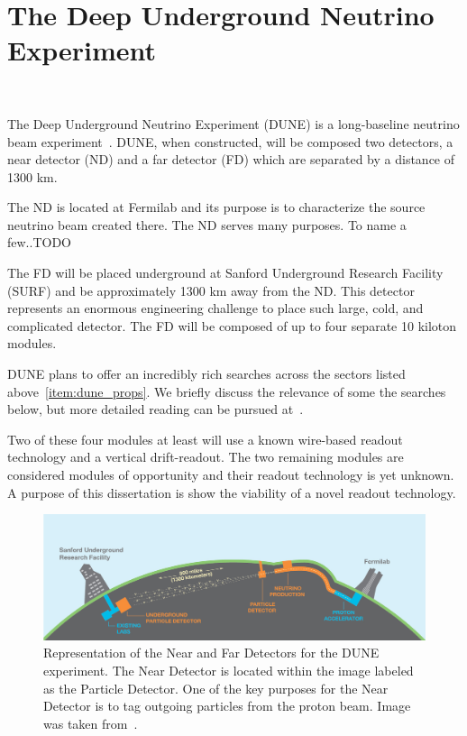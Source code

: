 
\section{The Deep Underground Neutrino Experiment}~\label{sec:dune}

The Deep Underground Neutrino Experiment (DUNE) is a long-baseline neutrino beam experiment~\citep{DUNE_TDR_V1_Abi_2020, DUNE_FD_TDRv2_2020, DUNE_TDRv3_Abi_2020, DUNE-FD_TDRv4:Abi_2020}.
DUNE, when constructed, will be composed two detectors, a near detector (ND) and a far detector (FD) which are separated by a distance of 1300 km.

The ND is located at Fermilab and its purpose is to characterize the source neutrino beam created there.
The ND serves many purposes.
To name a few..TODO

The FD will be placed underground at Sanford Underground Research Facility (SURF) and be approximately 1300 km away from the ND.
This detector represents an enormous engineering challenge to place such large, cold, and complicated detector.
The FD will be composed of up to four separate 10 kiloton modules.

DUNE plans to offer an incredibly rich searches across the sectors listed above~\ref{item:dune_props}.
We briefly discuss the relevance of some the searches below, but more detailed reading can be pursued at~\citep{DUNE_FD_TDRv2_2020}.

Two of these four modules at least will use a known wire-based readout technology and a vertical drift-readout.
The two remaining modules are considered modules of opportunity and their readout technology is yet unknown.
A purpose of this dissertation is show the viability of a novel readout technology.

\begin{figure}[]
\centering
\includegraphics[width=\textwidth]{images/LBNE_Graphic_061615_2016.jpg}
\caption{Representation of the Near and Far Detectors for the DUNE experiment. The Near Detector is located within the image labeled as the Particle Detector. One of the key purposes for the Near Detector is to tag outgoing particles from the proton beam. Image was taken from~\citep{dune_cdr_2016_arxiv}.}
\end{figure}

